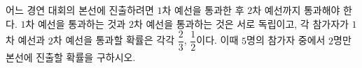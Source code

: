 어느 경연 대회의 본선에 진출하려면 $1$차 예선을 통과한 후 $2$차 예선까지 통과해야 한다. $1$차 예선을 통과하는 것과 $2$차 예선을 통과하는 것은 서로 독립이고, 각 참가자가 $1$차 예선과 $2$차 예선을 통과할 확률은 각각 $\dfrac{2}{3}$, $\dfrac{1}{2}$이다. 이때 $5$명의 참가자 중에서 $2$명만 본선에 진출할 확률을 구하시오.
